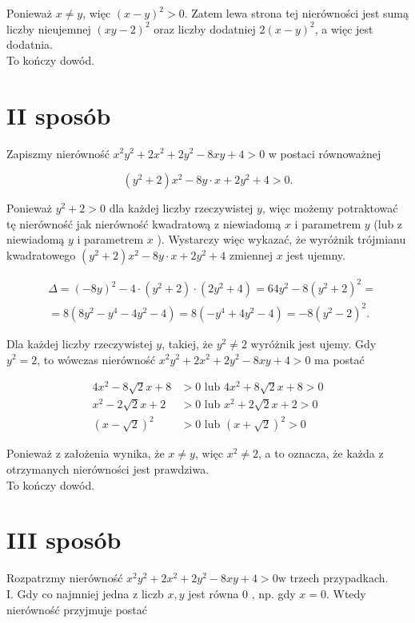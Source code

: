 \documentclass[10pt]{article}
\begin{document}
Ponieważ $x \neq y$, więc $(x-y)^{2}>0$. Zatem lewa strona tej nierówności jest sumą liczby nieujemnej $(x y-2)^{2}$ oraz liczby dodatniej $2(x-y)^{2}$, a więc jest dodatnia.\\
To kończy dowód.

\section*{II sposób}
Zapiszmy nierówność $x^{2} y^{2}+2 x^{2}+2 y^{2}-8 x y+4>0$ w postaci równoważnej

$$
\left(y^{2}+2\right) x^{2}-8 y \cdot x+2 y^{2}+4>0 .
$$

Ponieważ $y^{2}+2>0$ dla każdej liczby rzeczywistej $y$, więc możemy potraktować tę nierówność jak nierówność kwadratową z niewiadomą $x$ i parametrem $y$ (lub z niewiadomą $y$ i parametrem $x$ ). Wystarczy więc wykazać, że wyróżnik trójmianu kwadratowego $\left(y^{2}+2\right) x^{2}-8 y \cdot x+2 y^{2}+4$ zmiennej $x$ jest ujemny.

$$
\begin{aligned}
& \Delta=(-8 y)^{2}-4 \cdot\left(y^{2}+2\right) \cdot\left(2 y^{2}+4\right)=64 y^{2}-8\left(y^{2}+2\right)^{2}= \\
& =8\left(8 y^{2}-y^{4}-4 y^{2}-4\right)=8\left(-y^{4}+4 y^{2}-4\right)=-8\left(y^{2}-2\right)^{2} .
\end{aligned}
$$

Dla każdej liczby rzeczywistej $y$, takiej, że $y^{2} \neq 2$ wyróżnik jest ujemy. Gdy $y^{2}=2$, to wówczas nierówność $x^{2} y^{2}+2 x^{2}+2 y^{2}-8 x y+4>0$ ma postać

$$
\begin{aligned}
4 x^{2}-8 \sqrt{2} x+8 & >0 \text { lub } 4 x^{2}+8 \sqrt{2} x+8>0 \\
x^{2}-2 \sqrt{2} x+2 & >0 \text { lub } x^{2}+2 \sqrt{2} x+2>0 \\
(x-\sqrt{2})^{2} & >0 \text { lub }(x+\sqrt{2})^{2}>0
\end{aligned}
$$

Ponieważ z założenia wynika, że $x \neq y$, więc $x^{2} \neq 2$, a to oznacza, że każda z otrzymanych nierówności jest prawdziwa.\\
To kończy dowód.

\section*{III sposób}
Rozpatrzmy nierówność $x^{2} y^{2}+2 x^{2}+2 y^{2}-8 x y+4>0 \mathrm{w}$ trzech przypadkach.\\
I. Gdy co najmniej jedna z liczb $x, y$ jest równa 0 , np. gdy $x=0$. Wtedy nierówność przyjmuje postać
\end{document}
